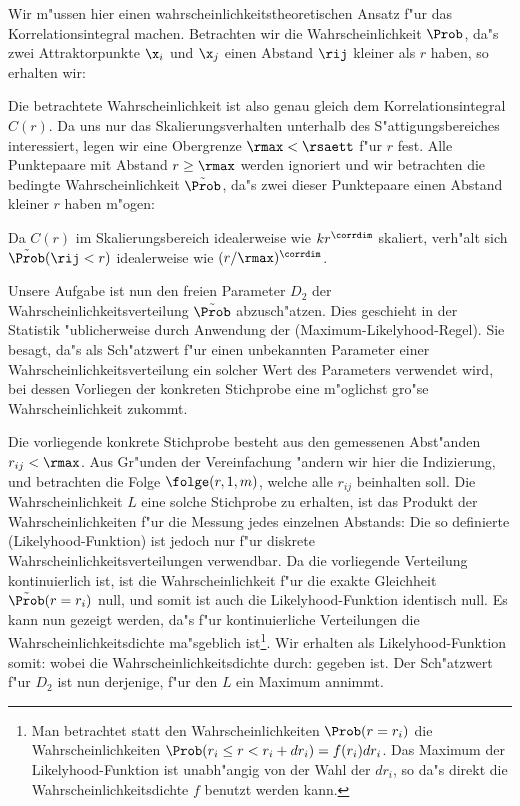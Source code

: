 Wir m"ussen hier einen wahrscheinlichkeitstheoretischen Ansatz f"ur das
Korrelationsintegral machen. Betrachten wir die Wahrscheinlichkeit $\Prob$, da"s zwei
Attraktorpunkte $\x_i$ und $\x_j$ einen Abstand $\rij$ kleiner als $r$ haben, so erhalten wir:

Die betrachtete Wahrscheinlichkeit ist also genau gleich dem Korrelationsintegral $C(r)$.
Da uns nur das Skalierungsverhalten unterhalb des S"attigungsbereiches interessiert,
legen wir eine Obergrenze $\rmax<\rsaett$ f"ur $r$ fest. Alle Punktepaare mit Abstand
$r\geq\rmax$ werden ignoriert und wir betrachten die bedingte Wahrscheinlichkeit $\tilde
\Prob$, da"s zwei dieser Punktepaare einen Abstand kleiner $r$ haben m"ogen:

Da $C(r)$ im Skalierungsbereich idealerweise wie $kr^\corrdim$ skaliert, verh"alt sich
$\tilde \Prob(\rij<r)$ idealerweise wie $(r/\rmax)^\corrdim$. 

Unsere Aufgabe ist nun den freien Parameter $D_2$ der Wahrscheinlichkeitsverteilung
$\tilde\Prob$ abzusch"atzen.  Dies geschieht in der Statistik "ublicherweise durch
Anwendung der \begriff(Maximum-Likelyhood-Regel).  Sie besagt, da"s als Sch"atzwert f"ur
einen unbekannten Parameter einer Wahrscheinlichkeitsverteilung ein solcher Wert des
Parameters verwendet wird, bei dessen Vorliegen der konkreten Stichprobe eine m"oglichst
gro"se Wahrscheinlichkeit zukommt.


Die vorliegende konkrete Stichprobe
besteht aus den gemessenen Abst"anden $r_{ij}<\rmax$. Aus Gr"unden der Vereinfachung
"andern wir hier die Indizierung, und betrachten die Folge $\folge(r,1,m)$, welche alle
$r_{ij}$ beinhalten soll.  Die Wahrscheinlichkeit $L$ eine solche Stichprobe zu erhalten,
ist das Produkt der Wahrscheinlichkeiten f"ur die Messung jedes einzelnen Abstands:
Die so definierte \begriff(Likelyhood-Funktion) ist jedoch nur f"ur diskrete
Wahrscheinlichkeitsverteilungen verwendbar.  Da die vorliegende Verteilung kontinuierlich
ist, ist die Wahrscheinlichkeit f"ur die exakte Gleichheit $\tilde\Prob(r=r_i)$ null, und
somit ist auch die Likelyhood-Funktion identisch null. Es kann nun gezeigt werden, da"s f"ur
kontinuierliche Verteilungen die Wahrscheinlichkeitsdichte ma"sgeblich ist\footnote{Man
  betrachtet statt den Wahrscheinlichkeiten $\Prob(r=r_i)$ die Wahrscheinlichkeiten $\Prob(r_i\leq r <r_i+
  dr_i) = f(r_i)dr_i$. Das Maximum der Likelyhood-Funktion ist unabh"angig von
  der Wahl der $dr_i$, so da"s direkt die Wahrscheinlichkeitsdichte $f$ benutzt werden kann.  }.
Wir erhalten als Likelyhood-Funktion somit:
wobei die Wahrscheinlichkeitsdichte durch:
gegeben ist.  Der Sch"atzwert f"ur $D_2$ ist nun derjenige, f"ur den $L$ ein Maximum
annimmt. 

